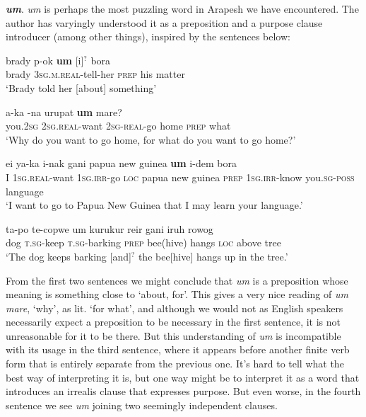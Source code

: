 \documentclass[pdftex,12pt,letterpaper]{article}
\let\ipa\textipa
\let\enya\textltailn
\def\sw{\ipa{\super w}}
\begin{document}
\textbf{\emph{um}}. \emph{um} is perhaps the most puzzling word in Arapesh we have encountered. The author has varyingly understood it as a preposition and a purpose clause introducer (among other things), inspired by the sentences below:

\begin{exe}
\ex\gll brady \ipa{na-k1ri}p-ok{\sw} \textbf{um} \ipa{@n@n}[i\ipa{\enya}]$^?$ bora\ipa{\enya} \\
brady \textsc{3sg.m.real}-tell-her \textsc{prep} his matter \\
\trans `Brady told her [about] something'

\ex\gll \ipa{\enya@} \ipa{\enya}a-ka \ipa{\enya@}-na urupat \textbf{um} mare?\\
you.\textsc{2sg} \textsc{2sg.real}-want \textsc{2sg-real}-go home \textsc{prep} what \\
\trans `Why do you want to go home, for what do you want to go home?'

\ex\gll ei ya-ka i-nak gani papua new guinea \textbf{um} i-d\ipa{1k}em \ipa{\enya@k-i\enya} bora\ipa{\enya} \\
I \textsc{1sg.real}-want \textsc{1sg.irr}-go \textsc{loc} papua new guinea \textsc{prep} \textsc{1sg.irr}-know you.\textsc{sg}-\textsc{poss} language \\
\trans `I want to go to Papua New Guinea that I may learn your language.'

\ex\gll \ipa{n1mbat} ta-po te-copwe um kurukur reir gani iruh rowog \\
dog \textsc{t.sg}-keep \textsc{t.sg}-barking \textsc{prep} bee(hive) hangs \textsc{loc} above tree \\
\trans `The dog keeps barking [and]$^?$ the bee[hive] hangs up in the tree.'
\end{exe}

\noindent From the first two sentences we might conclude that \emph{um} is a preposition whose meaning is something close to `about, for'. This gives a very nice reading of \emph{um mare}, `why', as lit. `for what', and although we would not as English speakers necessarily expect a preposition to be necessary in the first sentence, it is not unreasonable for it to be there. But this understanding of \emph{um} is incompatible with its usage in the third sentence, where it appears before another finite verb form that is entirely separate from the previous one. It's hard to tell what the best way of interpreting it is, but one way might be to interpret it as a word that introduces an irrealis clause that expresses purpose. But even worse, in the fourth sentence we see \emph{um} joining two seemingly independent clauses.
\end{document}
